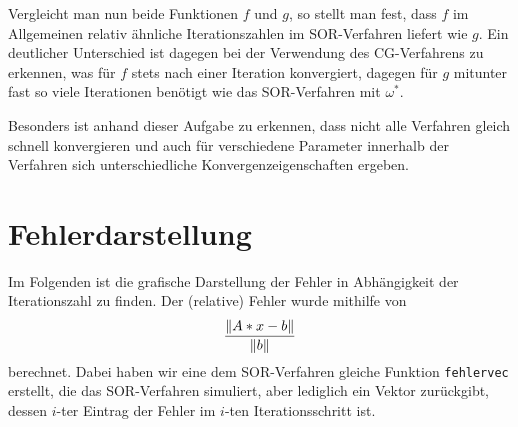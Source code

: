 \documentclass[ %
ngerman, %
a4paper, %
sectionreset, %
chapterstyle=framed, %
sectionstyle=dotted, %
titlefont=osfamily %
]{../../../../texmf/tex/latex/mathscriptMathTUD/mathscriptMathTUD}
\begin{document}
	Vergleicht man nun beide Funktionen $f$ und $g$, so stellt man fest, dass $f$ im Allgemeinen relativ ähnliche Iterationszahlen im SOR-Verfahren liefert wie $g$. Ein deutlicher Unterschied ist dagegen bei der Verwendung des CG-Verfahrens zu erkennen, was für $f$ stets nach einer Iteration konvergiert, dagegen für $g$ mitunter fast so viele Iterationen benötigt wie das SOR-Verfahren mit $\omega^\ast$.
	
	Besonders ist anhand dieser Aufgabe zu erkennen, dass nicht alle Verfahren gleich schnell konvergieren und auch für verschiedene Parameter innerhalb der Verfahren sich unterschiedliche Konvergenzeigenschaften ergeben.
	
	\section{Fehlerdarstellung}
	\newlength{\halfpage}
	\setlength{\halfpage}{\dimexpr0.5\linewidth-\fboxrule-\fboxsep}
	
	Im Folgenden ist die grafische Darstellung der Fehler in Abhängigkeit der Iterationszahl zu finden. Der (relative) Fehler wurde mithilfe von
	\begin{equation*}
		\frac{\left\lVert A*x - b \right\rVert}{\left\lVert b \right\rVert}
	\end{equation*}
	berechnet. Dabei haben wir eine dem SOR-Verfahren gleiche Funktion \texttt{fehlervec} erstellt, die das SOR-Verfahren simuliert, aber lediglich ein Vektor zurückgibt, dessen $i$-ter Eintrag der Fehler im $i$-ten Iterationsschritt ist. 
\end{document}
